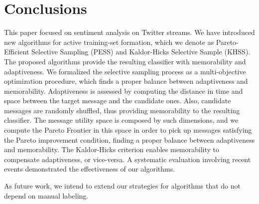 \section{Conclusions}

This paper focused on sentiment analysis on Twitter streams. We have introduced new algorithms for active training-set formation, which we denote as Pareto-Efficient Selective Sampling (PESS) and Kaldor-Hicks Selective Sample (KHSS). The proposed algorithms provide the resulting classifier with memorability and adaptiveness. We formalized the selective sampling process as a multi-objective optimization procedure, which finds a proper balance between adaptiveness and memorability.
Adaptiveness is assessed by computing the distance in time and space between the target message and the candidate ones. Also, candidate messages are randomly shuffled, thus providing memorability to the resulting classifier. The message utility space is composed by such dimensions, and we compute the Pareto Frontier in this space in order to pick up messages satisfying the Pareto improvement condition, finding a proper balance between adaptiveness and memorability. The Kaldor-Hicks criterion enables memorability to compensate adaptiveness, or vice-versa. A systematic evaluation involving recent events demonstrated the effectiveness of our algorithms.

As future work, we intend to extend our strategies for algorithms that do not depend on manual labeling.
